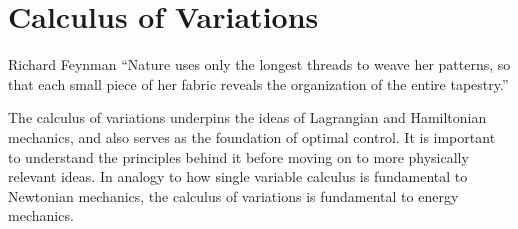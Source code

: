 \chapter{Calculus of Variations}\label{chap:calculus of variations}


\begin{chapquote}{Richard Feynman}
 ``Nature uses only the longest threads to weave her patterns, so that each small piece of her fabric reveals the organization of the entire tapestry.''
\end{chapquote}

The calculus of variations underpins the ideas of \gls{Lagrangian} and \gls{Hamiltonian} mechanics, and also serves as the foundation of optimal control. It is important to understand the principles behind it before moving on to more physically relevant ideas. In analogy to how single variable calculus is fundamental to Newtonian mechanics, the calculus of variations is fundamental to energy mechanics.

